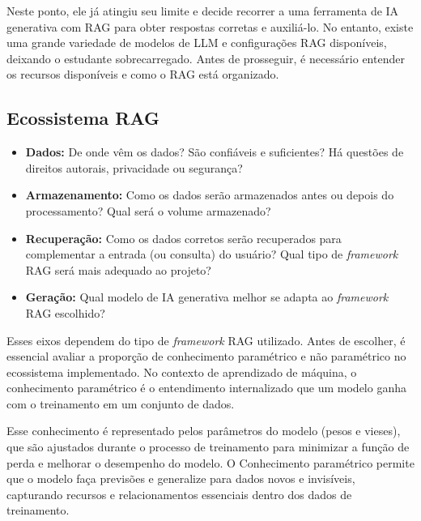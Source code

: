 \documentclass[a4paper, 12pt]{article}
\begin{document}
    Neste ponto, ele já atingiu seu limite e decide recorrer a uma ferramenta de IA generativa com RAG para obter respostas corretas e auxiliá-lo. No entanto, existe uma grande variedade de modelos de LLM e configurações RAG disponíveis, deixando o estudante sobrecarregado. Antes de prosseguir, é necessário entender os recursos disponíveis e como o RAG está organizado.

    \subsection{Ecossistema RAG}

    
    \begin{itemize}
        \item \textbf{Dados:} De onde vêm os dados? São confiáveis e suficientes? Há questões de direitos autorais, privacidade ou segurança?
        \item \textbf{Armazenamento:} Como os dados serão armazenados antes ou depois do processamento? Qual será o volume armazenado?
        \item \textbf{Recuperação:} Como os dados corretos serão recuperados para complementar a entrada (ou consulta) do usuário? Qual tipo de \textit{framework} RAG será mais adequado ao projeto?
        \item \textbf{Geração:} Qual modelo de IA generativa melhor se adapta ao \textit{framework} RAG escolhido?
    \end{itemize} 

    Esses eixos dependem do tipo de \textit{framework} RAG utilizado. Antes de escolher, é essencial avaliar a proporção de conhecimento paramétrico e não paramétrico no ecossistema implementado. No contexto de aprendizado de máquina, o conhecimento paramétrico é o entendimento internalizado que um modelo ganha com o treinamento em um conjunto de dados. 
    
    Esse conhecimento é representado pelos parâmetros do modelo (pesos e vieses), que são ajustados durante o processo de treinamento para minimizar a função de perda e melhorar o desempenho do modelo. O Conhecimento paramétrico permite que o modelo faça previsões e generalize para dados novos e invisíveis, capturando recursos e relacionamentos essenciais dentro dos dados de treinamento.
    
\end{document}
